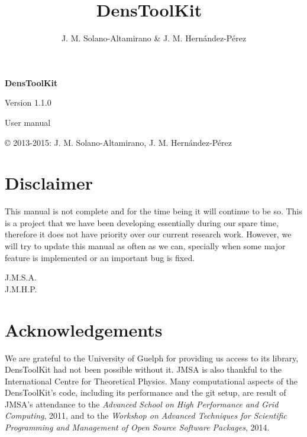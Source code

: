 \documentclass[12pt]{book}
\title{\textbf{Dens\-Tool\-Kit~\dtkversion}}
\author{J. M. Solano-Altamirano \& J. M. Hern\'andez-P\'erez}
\newcommand{\DTK}{Dens\-Tool\-Kit}
\newcommand{\dtkversion}{1.1.0}
\begin{document}
\frontmatter
\maketitle

\newpage
\thispagestyle{empty}
\phantom{asf}
\newpage
\thispagestyle{empty}
\phantom{asf}
\vspace{5cm}
\begin{center}

{\HUGE\bf Dens\-Tool\-Kit}

\vspace{1cm}

{\Huge Version \dtkversion}

\vspace{1cm}

{\Huge User manual}

\end{center}

\vspace{8cm}
\copyright{} 2013-2015: J. M. Solano-Altamirano, J. M. Hern\'andez-P\'erez

\newpage\thispagestyle{empty}
\phantom{asd}

\vspace{50mm}

\section*{Disclaimer}

This manual is not complete and for the time being it will continue to be so. This is a project that we have been developing essentially during our spare time, therefore it does not have priority over our current research work. However, we will try to update this manual as often as we can, specially when some major feature is implemented or an important bug is fixed.

\begin{flushright} J.M.S.A. \\ J.M.H.P.\end{flushright}

\newpage\thispagestyle{empty}
\phantom{asd}

\vspace{50mm}

\section*{Acknowledgements}

We are grateful to the University of Guelph for providing us access to its library, \DTK{} 
had not been possible without it. JMSA is also thankful to the International Centre for 
Theoretical Physics. Many computational aspects of the \DTK's code, including its performance and the 
git setup, are result of JMSA's attendance to the \textit{Advanced School on High Performance 
and Grid Computing}, 2011, and to the \textit{Workshop on Advanced Techniques for Scientific 
Programming and Management of Open Source Software Packages}, 2014.
\end{document}
